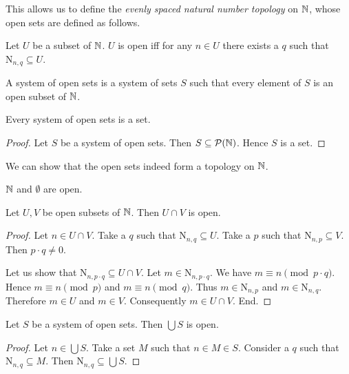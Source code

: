 \documentclass{article}
\newcommand{\N}{\mathrm{N}}
\begin{document}
  This allows us to define the \textit{evenly spaced natural number
  topology} on $\mathbb{N}$, whose open sets are defined as follows.

  \begin{forthel}
    \begin{definition}
      Let $U$ be a subset of $\mathbb{N}$.
      $U$ is open iff for any $n \in U$ there exists a $q$ such that
      $\N_{n, q} \subseteq U$.
    \end{definition}

    \begin{definition}
      A system of open sets is a system of sets $S$ such that every element of
      $S$ is an open subset of $\mathbb{N}$.
    \end{definition}

    \begin{lemma}
      Every system of open sets is a set.
    \end{lemma}
    \begin{proof}
      Let $S$ be a system of open sets.
      Then $S \subseteq \mathcal{P}(\mathbb{N})$.
      Hence $S$ is a set.
    \end{proof}
  \end{forthel}

  We can show that the open sets indeed form a topology on $\mathbb{N}$.

  \begin{forthel}
    \begin{lemma}
      $\mathbb{N}$ and $\emptyset$ are open.
    \end{lemma}

    \begin{lemma}
      Let $U,V$ be open subsets of $\mathbb{N}$.
      Then $U \cap V$ is open.
    \end{lemma}
    \begin{proof}
      Let $n \in U \cap V$.
      Take a $q$ such that $\N_{n, q} \subseteq U$.
      Take a $p$ such that $\N_{n, p} \subseteq V$.
      Then $p \cdot q \neq 0$.

      Let us show that $\N_{n, p \cdot q} \subseteq U \cap V$.
        Let $m \in \N_{n, p \cdot q}$.
        We have $m \equiv n \pmod{p \cdot q}$.
        Hence $m \equiv n \pmod{p}$ and $m \equiv n \pmod{q}$.
        Thus $m \in \N_{n, p}$ and $m \in \N_{n, q}$.
        Therefore $m \in U$ and $m \in V$.
        Consequently $m \in U \cap V$.
      End.
    \end{proof}

    \begin{lemma}
      Let $S$ be a system of open sets.
      Then $\bigcup S$ is open.
    \end{lemma}
    \begin{proof}
      Let $n \in \bigcup S$.
      Take a set $M$ such that $n \in M \in S$.
      Consider a $q$ such that $\N_{n, q} \subseteq M$.
      Then $\N_{n, q} \subseteq \bigcup S$.
    \end{proof}
  \end{forthel}
\end{document}
